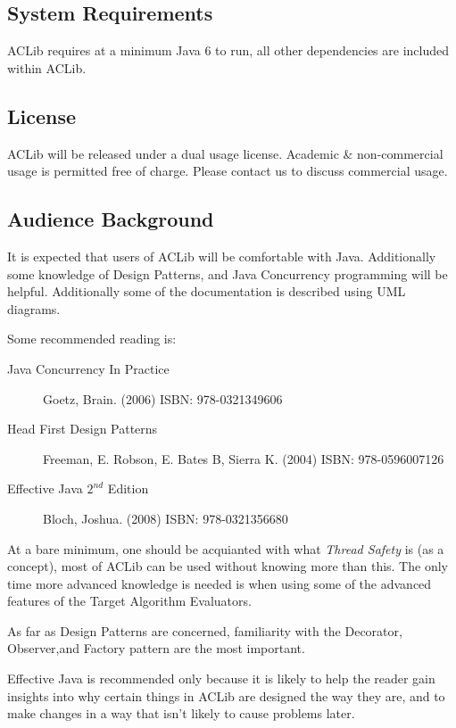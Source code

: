 \documentclass[11pt,letterpaper,oneside]{article}
\begin{document}
\subsection{System Requirements}

ACLib requires at a minimum Java 6 to run, all other dependencies are included within ACLib.

\subsection{License}

ACLib will be released under a dual usage license. Academic \& non-commercial usage is permitted free of charge. Please contact us to discuss commercial usage.


\subsection{Audience Background}

It is expected that users of ACLib will be comfortable with Java. Additionally   some knowledge of Design Patterns, and Java Concurrency programming will be helpful. Additionally some of the documentation is described using UML diagrams. 

Some recommended reading is:

\begin{description}

\item[Java Concurrency In Practice] Goetz, Brain. (2006) ISBN: 978-0321349606

\item[Head First Design Patterns] Freeman, E. Robson, E. Bates B, Sierra K. (2004) ISBN: 978-0596007126

\item[Effective Java $2^{nd}$ Edition] Bloch, Joshua. (2008) ISBN: 978-0321356680 
\end{description}


At a bare minimum, one should be acquianted with what \emph{Thread Safety} is (as a concept), most of ACLib can be used without knowing more than this. The only time more advanced knowledge is needed is when using some of the advanced features of the Target Algorithm Evaluators.

As far as Design Patterns are concerned, familiarity with the Decorator, Observer,and Factory pattern are the most important.

Effective Java is recommended only because it is likely to help the reader gain insights into why certain things in ACLib are designed the way they are, and to make changes in a way that isn't likely to cause problems later.
\end{document}
